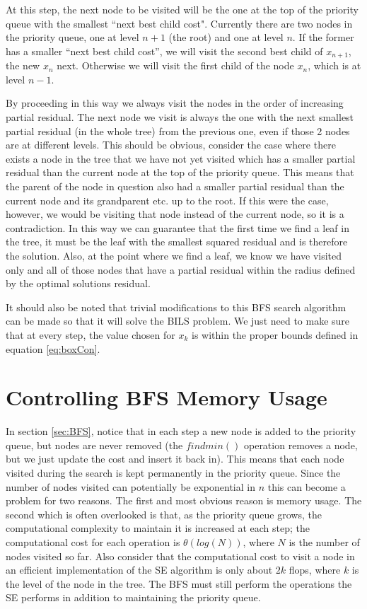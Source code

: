 \documentclass[12pt,Bold,letterpaper]{mcgilletdclass}
\newcommand{\vsp}{\vspace{\baselineskip}}
\begin{document}
At this step, the next node to be visited will be the one at the top of the priority queue with the smallest ``next best child cost". Currently there are two nodes in the priority queue, one at level $n+1$ (the root) and one at level $n$. If the former has a smaller ``next best child cost'', we will visit the second best child of $x_{n+1}$, the new $x_{n}$ next. Otherwise we will visit the first child of the node $x_{n}$, which is at level $n-1$.

By proceeding in this way we always visit the nodes in the order of increasing partial residual. The next node we visit is always the one with the next smallest partial residual (in the whole tree) from the previous one, even if those 2 nodes are at different levels. This should be obvious, consider the case where there exists a node in the tree that we have not yet visited which has a smaller partial residual than the current node at the top of the priority queue. This means that the parent of the node in question also had a smaller partial residual than the current node and its grandparent etc. up to the root. If this were the case, however, we would be visiting that node instead of the current node, so it is a contradiction. In this way we can guarantee that the first time we find a leaf in the tree, it must be the leaf with the smallest squared residual and is therefore the solution. Also, at the point where we find a leaf, we know we have visited only and all of those nodes that have a partial residual within the radius defined by the optimal solutions residual.

It should also be noted that trivial modifications to this BFS search algorithm can be made so that it will solve the BILS problem. We just need to make sure that at every step, the value chosen for $x_k$ is within the proper bounds defined in equation \eqref{eq:boxCon}.

\vsp \section{Controlling BFS Memory Usage} \label{sec:controlBFS}

In section \ref{sec:BFS}, notice that in each step a new node is added to the priority queue, but nodes are never removed (the $findmin()$ operation removes a node, but we just update the cost and insert it back in). This means that each node visited during the search is kept permanently in the priority queue. Since the number of nodes visited can potentially be exponential in $n$ this can become a problem for two reasons. The first and most obvious reason is memory usage. The second which is often overlooked is that, as the priority queue grows, the computational complexity to maintain it is increased at each step; the computational cost for each operation is $\theta(log(N))$, where $N$ is the number of nodes visited so far. Also consider that the computational cost to visit a node in an efficient implementation of the SE algorithm is only about $2k$ flops, where $k$ is the level of the node in the tree. The BFS must still perform the operations the SE performs in addition to maintaining the priority queue.
\end{document}
